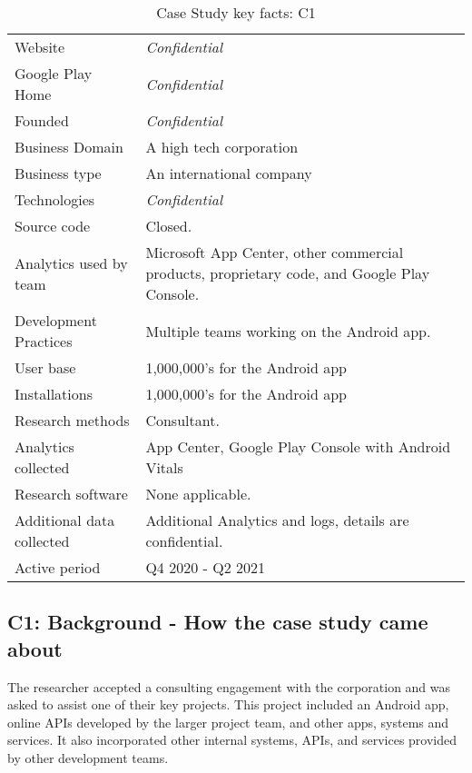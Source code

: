 {\renewcommand{\arraystretch}{0.8}%
\begin{table}[htbp!]
    \centering
    \small
    \setlength{\tabcolsep}{6pt}
    \begin{tabular}{lp{9cm}}
       \toprule
       Website &\textit{Confidential} \\
       Google Play Home & \textit{Confidential} \\
       Founded & \textit{Confidential} \\
       Business Domain & A high tech corporation \\
       Business type & An international company \\
       Technologies  & \textit{Confidential} \\
       Source code  &Closed. \\
       Analytics used by team & Microsoft App Center, other commercial products, proprietary code, and Google Play Console. \\
       Development Practices & Multiple teams working on the Android app. \\
       \midrule
       User base & 1,000,000's for the Android app \\
       Installations & 1,000,000's for the Android app \\
       \midrule
       Research methods &Consultant. \\
       Analytics collected &App Center, Google Play Console with Android Vitals \\
       Research software & None applicable. \\
       Additional data collected &Additional Analytics and logs, details are confidential. \\
       Active period & Q4 2020 - Q2 2021 \\
       \bottomrule
    \end{tabular}
    \caption{Case Study key facts: C1}
    \label{tab:blank_case_study_anaytics_overview}
\end{table}
}

\subsection{C1: Background - How the case study came about}
The researcher accepted a consulting engagement with the corporation and was asked to assist one of their key projects. This project included an Android app, online APIs developed by the larger project team, and other apps, systems and services. It also incorporated other internal systems, APIs, and services provided by other development teams. 

